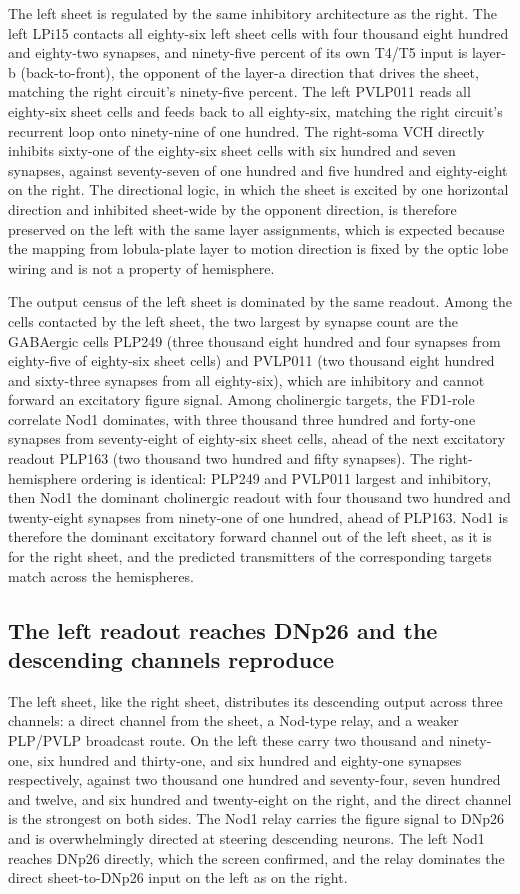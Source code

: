 \documentclass[11pt]{article}
\begin{document}
The left sheet is regulated by the same inhibitory architecture as the right. The left LPi15
contacts all eighty-six left sheet cells with four thousand eight hundred and eighty-two
synapses, and ninety-five percent of its own T4/T5 input is layer-b (back-to-front), the opponent
of the layer-a direction that drives the sheet, matching the right circuit's ninety-five percent.
The left PVLP011 reads all eighty-six sheet cells and feeds back to all eighty-six, matching the
right circuit's recurrent loop onto ninety-nine of one hundred. The right-soma VCH directly
inhibits sixty-one of the eighty-six sheet cells with six hundred and seven synapses, against
seventy-seven of one hundred and five hundred and eighty-eight on the right. The directional
logic, in which the sheet is excited by one horizontal direction and inhibited sheet-wide by the
opponent direction, is therefore preserved on the left with the same layer assignments, which is
expected because the mapping from lobula-plate layer to motion direction is fixed by the optic
lobe wiring and is not a property of hemisphere.

The output census of the left sheet is dominated by the same readout. Among the cells contacted
by the left sheet, the two largest by synapse count are the GABAergic cells PLP249 (three
thousand eight hundred and four synapses from eighty-five of eighty-six sheet cells) and PVLP011
(two thousand eight hundred and sixty-three synapses from all eighty-six), which are inhibitory
and cannot forward an excitatory figure signal. Among cholinergic targets, the FD1-role correlate
Nod1 dominates, with three thousand three hundred and forty-one synapses from seventy-eight of
eighty-six sheet cells, ahead of the next excitatory readout PLP163 (two thousand two hundred and
fifty synapses). The right-hemisphere ordering is identical: PLP249 and PVLP011 largest and
inhibitory, then Nod1 the dominant cholinergic readout with four thousand two hundred and
twenty-eight synapses from ninety-one of one hundred, ahead of PLP163. Nod1 is therefore the
dominant excitatory forward channel out of the left sheet, as it is for the right sheet, and the
predicted transmitters of the corresponding targets match across the hemispheres.

\subsection{The left readout reaches DNp26 and the descending channels reproduce}

The left sheet, like the right sheet, distributes its descending output across three channels: a
direct channel from the sheet, a Nod-type relay, and a weaker PLP/PVLP broadcast route. On the
left these carry two thousand and ninety-one, six hundred and thirty-one, and six hundred and
eighty-one synapses respectively, against two thousand one hundred and seventy-four, seven
hundred and twelve, and six hundred and twenty-eight on the right, and the direct channel is the
strongest on both sides. The Nod1 relay carries the figure signal to DNp26 and is overwhelmingly
directed at steering descending neurons. The left Nod1 reaches DNp26 directly, which the screen
confirmed, and the relay dominates the direct sheet-to-DNp26 input on the left as on the right.
\end{document}
